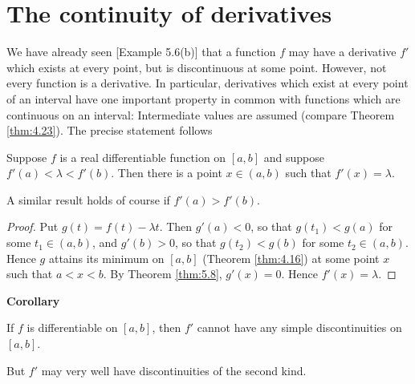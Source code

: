 \section{The continuity of derivatives}

We have already seen [Example 5.6(b)] that 
a function $f$ may have a derivative $f'$ which exists at every point, 
but is discontinuous at some point. 
However, not every function is a derivative. 
In particular, derivatives which exist at every point of an interval 
have one important property in common with functions
which are continuous on an interval:
Intermediate values are assumed (compare Theorem \ref{thm:4.23}). 
The precise statement follows

\begin{thm}
    \label{thm:5.12}
    Suppose $f$ is a real differentiable function on $[a, b]$ 
    and suppose $f'(a) < \lambda <f'(b)$. 
    Then there is a point $x \in (a, b)$ 
    such that $f'(x) = \lambda$.
\end{thm}
A similar result holds of course if $f'(a) > f'(b)$.
\begin{proof}
    Put $g(t) = f(t) - \lambda t$. 
    Then $g'(a) < 0$, so that $g(t_1) < g(a)$ for some $t_1 \in (a, b)$, 
    and  $g'(b) > 0$, so that $g(t_2) < g(b)$ for some $t_2 \in (a, b)$. 
    Hence $g$ attains its minimum on $[a, b]$ (Theorem \ref{thm:4.16}) at some point $x$ such that $a < x < b$. 
    By Theorem \ref{thm:5.8}, $g'(x) = 0$. 
    Hence $f'(x) = \lambda$.
\end{proof}

\textbf{Corollary}

If $f$ is differentiable on $[a, b]$, 
then $f'$ cannot have any simple discontinuities on $[a, b]$.

But $f'$ may very well have discontinuities of the second kind.